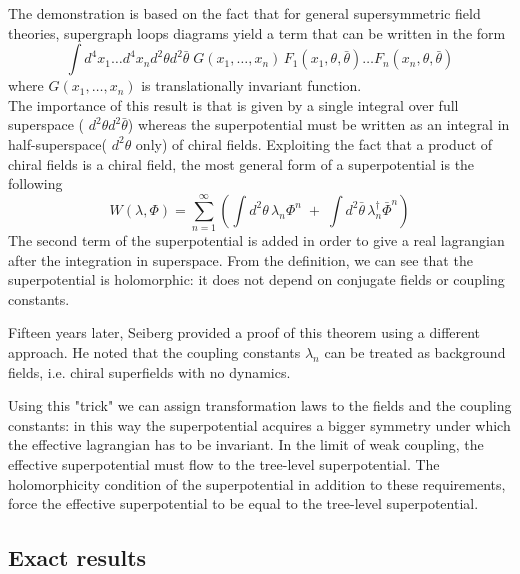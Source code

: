 The demonstration is based on the fact that for general supersymmetric field theories, supergraph loops diagrams yield a term that can be written in the form
\begin{equation}
\int  d^4 x_1 \dots d^4 x_n d^2 \theta d^2 \bar{\theta} \; G (x_1 , \dots , x_n) \,F_1 ( x_1, \theta, \bar{\theta}) \dots  F_n ( x_n, \theta, \bar{\theta}) 
\end{equation} 
where $G (x_1 , \dots , x_n) $ is translationally invariant function.\\
The importance of this result is that is given by a single integral over full superspace ( $d^2 \theta d^2 \bar{\theta} $) whereas the superpotential must be written as an integral in half-superspace( $d^2 \theta $ only) of chiral fields.
Exploiting the fact that a product of chiral fields is a chiral field, the most general form of a superpotential is the following
\begin{equation}
 W (\lambda, \Phi) = \sum_{n=1}^{\infty} \left( \int d^2 \theta \, \lambda_n \Phi^n  \; +\;  \int d^2 \bar{\theta} \, \lambda_n^{\dagger} \bar{\Phi}^n \right)
 \end{equation} 
 The second term of the superpotential is added in order to give a real lagrangian after the integration in superspace.
From the definition, we can see that the superpotential is holomorphic: it does not depend on conjugate fields or coupling constants.

Fifteen years later, Seiberg \cite{Seiberg:1993vc} provided a proof of this theorem using a different approach.
He noted that the coupling constants $\lambda_n$ can be treated as background fields, i.e. chiral superfields with no dynamics.




Using this "trick" we can assign transformation laws to the fields and the coupling constants: in this way the superpotential acquires a bigger symmetry under which the effective lagrangian has to be invariant. 
In the limit of weak coupling, the effective superpotential must  flow to the tree-level superpotential. 
The holomorphicity condition of the superpotential in addition to these requirements, force the effective superpotential to be equal to the tree-level superpotential.


\subsection{Exact results}